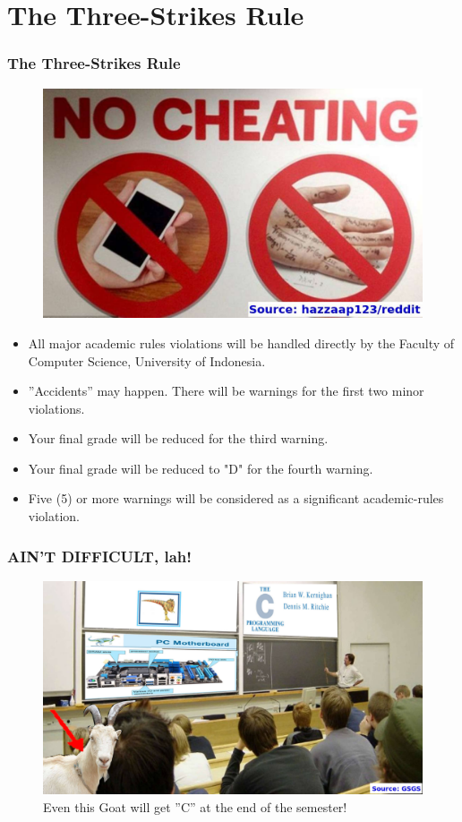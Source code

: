 \documentclass[xcolor=table, notheorems, hyperref={pdfpagelabels=false}]{beamer}
\begin{document}
\section{The Three-Strikes Rule}
\begin{frame}[fragile]
\frametitle{The Three-Strikes Rule}

\begin{figure}
\includegraphics[width=0.37\linewidth]{os-cheating}
\end{figure}

\begin{itemize}
\item All major academic rules violations will be handled directly by the Faculty of Computer Science,
University of Indonesia.
\item ''Accidents'' may happen. There will be warnings for the first two minor violations.
\item Your final grade will be reduced for the third warning.
\item Your final grade will be reduced to "D" for the fourth warning.
\item Five (5) or more warnings will be considered as a significant academic-rules violation.
\end{itemize}

\end{frame}

\begin{frame}[fragile]
\frametitle{AIN'T DIFFICULT, lah!}
\begin{figure}
\includegraphics[width=0.90\linewidth]{os-kambing-kuliah-c}
\caption{Even this Goat will get ''C'' at the end of the semester!}
\end{figure}
\end{frame}
\end{document}
